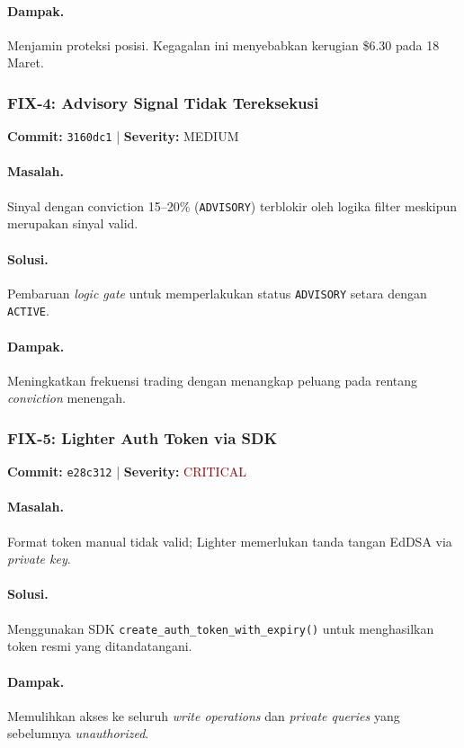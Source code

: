 \documentclass[10pt,a4paper]{article}
\begin{document}
\paragraph{Dampak.} Menjamin proteksi posisi. Kegagalan ini menyebabkan kerugian \$6.30 pada 18 Maret.

\subsubsection{FIX-4: Advisory Signal Tidak Tereksekusi}
\textbf{Commit:} \texttt{3160dc1} | \textbf{Severity:} MEDIUM

\paragraph{Masalah.} Sinyal dengan conviction 15--20\% (\texttt{ADVISORY}) terblokir oleh logika filter meskipun merupakan sinyal valid.
\paragraph{Solusi.} Pembaruan \textit{logic gate} untuk memperlakukan status \texttt{ADVISORY} setara dengan \texttt{ACTIVE}.
\paragraph{Dampak.} Meningkatkan frekuensi trading dengan menangkap peluang pada rentang \textit{conviction} menengah.

\subsubsection{FIX-5: Lighter Auth Token via SDK}
\textbf{Commit:} \texttt{e28c312} | \textbf{Severity:} \textcolor{darkred}{CRITICAL}

\paragraph{Masalah.} Format token manual tidak valid; Lighter memerlukan tanda tangan EdDSA via \textit{private key}.
\paragraph{Solusi.} Menggunakan SDK \texttt{create\_auth\_token\_with\_expiry()} untuk menghasilkan token resmi yang ditandatangani.
\paragraph{Dampak.} Memulihkan akses ke seluruh \textit{write operations} dan \textit{private queries} yang sebelumnya \textit{unauthorized}.
\end{document}
